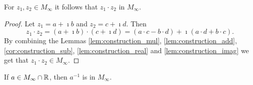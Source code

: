 \begin{corollary}
    \label{cor:construction_mul_complex}
    \leanok
    For $z_1, z_2 \in M_{\infty}$ it follows that $z_1 \cdot z_2$ in $M_{\infty}$.
\end{corollary}
\begin{proof}
    \leanok
    Let $z_1 = a + \imath b$ and $z_2 = c + \imath d$. Then $$z_1 \cdot z_2 = (a + \imath b) \cdot (c + \imath d) = (a \cdot c - b \cdot d) + \imath (a \cdot d + b \cdot c).$$
    By combining the Lemmas \ref{lem:construction_mul}, \ref{lem:construction_add}, \ref{cor:construction_sub}, \ref{lem:construction_real} and \ref{lem:construction_imag} we get that $z_1 \cdot z_2 \in M_{\infty}$.
\end{proof}

\begin{lemma}
    \label{lem:construction_inv}
    \leanok
    If $a \in M_{\infty}\cap\mathbb{R}$, then $a^{-1}$ is in  $M_{\infty}$.
\end{lemma}

